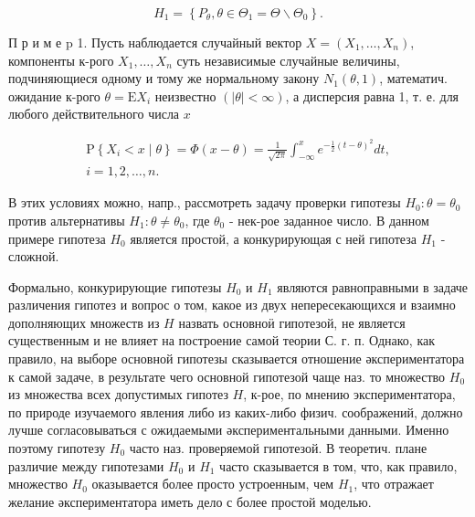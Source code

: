 \documentclass[10pt]{article}
\begin{document}
\[

H_{1}=\left\{P_{\theta}, \theta \in \Theta_{1}=\Theta \backslash \Theta_{0}\right\} .

\]



П р и м е p 1. Пусть наблюдается случайный вектор $X=\left(X_{1}, \ldots, X_{n}\right)$, компоненты к-рого $X_{1}, \ldots, X_{n}$ суть независимые случайные величины, подчиняющиеся одному и тому же нормальному закону $N_{1}(\theta, 1)$, математич. ожидание к-рого $\theta=\mathrm{E} X_{i}$ неизвестно $(|\theta|<\infty)$, а дисперсия равна 1, т. е. для любого действительного числа $x$



\[

\begin{gathered}

\mathrm{P}\left\{X_{i}<x \mid \theta\right\}=\Phi(x-\theta)=\frac{1}{\sqrt{2 \pi}} \int_{-\infty}^{x} e^{-\frac{1}{2}(t-\theta)^{2}} d t, \\

i=1,2, \ldots, n .

\end{gathered}

\]



В этих условиях можно, напр., рассмотреть задачу проверки гипотезы $H_{0}: \theta=\theta_{0}$ против альтернативы $H_{1}: \theta \neq \theta_{0}$, где $\theta_{0}$ - нек-рое заданное число. В данном примере гипотеза $H_{0}$ является простой, а конкурирующая с ней гипотеза $H_{1}$ - сложной.



Формально, конкурирующие гипотезы $H_{0}$ и $H_{1}$ являются равноправными в задаче различения гипотез и вопрос о том, какое из двух непересекающихся и взаимно дополняющих множеств из $H$ назвать основноӥ гипотезой, не является существенным и не влияет на построение самой теории С. г. п. Однако, как правило, на выборе основной гипотезы сказывается отношение әкспериментатора к самой задаче, в результате чего основной гипотезой чаще наз. то множество $H_{0}$ из множества всех допустимых гипотез $H$, к-рое, по мнению экспериментатора, по природе изучаемого явления либо из каких-либо физич. соображений, должно лучше согласовываться с ожидаемыми әкспериментальными данными. Именно поэтому гипотезу $H_{0}$ часто наз. проверяемой гипотезой. В теоретич. плане различие между гипотезами $H_{0}$ и $H_{1}$ часто сказывается в том, что, как правило, множество $H_{0}$ оказывается более просто устроенным, чем $H_{1}$, что отражает желание әкспериментатора иметь дело с более простой моделью.
\end{document}
